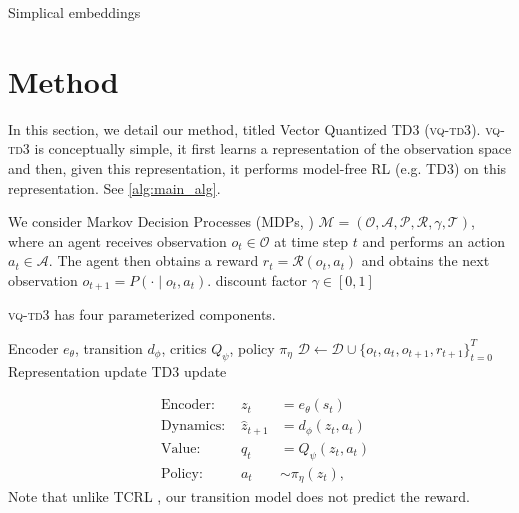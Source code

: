 \documentclass{article}
\theoremstyle{plain}
\theoremstyle{definition}
\theoremstyle{remark}
\newcommand{\our}{\textsc{vq-td3}\xspace}
\begin{document}
Simplical embeddings
\cite{lavoieSimplicialEmbeddingsSelfSupervised2022}


\section{Method}
\label{sec:method}

In this section, we detail our method, titled Vector Quantized TD3 (\our).
\our is conceptually simple, it first learns a representation of the observation space and then,
given this representation, it performs model-free RL (e.g. TD3) on this representation.
See \cref{alg:main_alg}.

We consider Markov Decision Processes (MDPs, \citet{bellmanMarkovianDecisionProcess1957a}) $\mathcal{M} = (\mathcal{O}, \mathcal{A}, \mathcal{P}, \mathcal{R}, \gamma,\mathcal{T})$, where an agent receives
observation $o_{t} \in \mathcal{O}$ at time step $t$ and performs an action $a_{t} \in \mathcal{A}$.
The agent then obtains a reward $r_{t} = \mathcal{R} (o_{t}, a_{t})$ and obtains the next observation
$o_{t+1} = P(\cdot \mid o_{t}, a_{t})$.
discount factor $\gamma \in [0, 1]$


\our has four parameterized components.
\begin{algorithm}[tb]
   \caption{\our}
   \label{alg:main_alg}
\begin{algorithmic}
    Encoder $e_{\theta}$, transition $d_{\phi}$, critics $Q_{\psi}$, policy $\pi_{\eta}$
    \STATE $\mathcal{D} \leftarrow \mathcal{D} \cup \{o_{t}, a_{t}, o_{t+1}, r_{t+1}\}^{T}_{t=0}$
        \STATE Representation update
        \STATE TD3 update
    \ENDFOR
   \ENDFOR
\end{algorithmic}
\end{algorithm}


\begin{align}
&\text{Encoder: } & z_{t} &= e_{\theta} (s_{t}) \label{eq:encoder} \\
&\text{Dynamics: } & \hat{z}_{t+1} &= d_{\phi} (z_{t}, a_{t}) \label{eq:transition} \\
&\text{Value: } & q_{t} &= Q_{\psi} (z_{t}, a_{t}) \label{eq:value} \\
&\text{Policy: } & a_{t} &\sim \pi_{\eta} (z_{t}) , \label{eq:policy}
\end{align}
Note that unlike TCRL \citep{zhaoSimplifiedTemporalConsistency2023}, our transition model does
not predict the reward.
\end{document}
